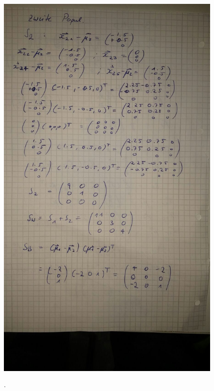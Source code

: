 \FloatBarrier
\begin{figure}
  \centering
  \includegraphics[width=\textwidth]{bild2.jpeg}
  \caption{}.
  \label{fig:2}
\end{figure}
\FloatBarrier

